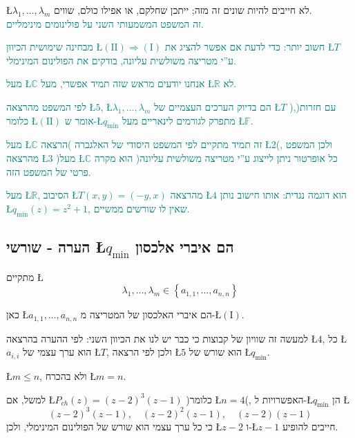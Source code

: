 \documentclass[english,hebrew]{article}
\begin{document}
\L{$\lambda_{1},\dots,\lambda_{m}$} לא חייבים להיות שונים זה מזה;
ייתכן שחלקם, או אפילו כולם, שווים. \\

\textcolor{teal}{זה המשפט המשמעותי השני על פולינומים מינימליים.}

\textcolor{teal}{מבחינה שימושית הכיוון \L{$(\text{II})\Rightarrow(\text{I})$}
חשוב יותר: כדי לדעת אם אפשר להציג את \L{$T$} ע\textquotedblright י
מטריצה משולשית עליונה, בודקים את הפולינום המינימלי.}

\textcolor{teal}{מעל \L{$\mathbb{C}$} אנחנו יודעים מראש שזה תמיד
אפשרי, מעל \L{$\mathbb{R}$} לא.}

\textcolor{teal}{לפי המשפט מהרצאה \L{$5$}, \L{$\lambda_{1},\dots,\lambda_{m}$}
הם בדיוק הערכים העצמיים של \L{$T$} )עם חזרות(, כלומר \L{$(\text{II})$}
אומר ש-\L{$q_{\min}$} מתפרק לגורמים לינאריים מעל \L{$\mathbb{F}$}.}

\textcolor{teal}{מעל \L{$\mathbb{C}$} זה תמיד מתקיים לפי המשפט היסודי
של האלגברה )הרצאה \L{$2$}(, ולכן המשפט מהרצאה \L{$3$} )מעל \L{$\mathbb{C}$}
כל אופרטור ניתן לייצוג ע\textquotedblright י מטריצה משולשית עליונה(
הוא מקרה פרטי של המשפט הזה. }

\textcolor{teal}{מעל \L{$\mathbb{R}$}, הסיבוב \L{$T(x,y)=(-y,x)$}
מהרצאה \L{$4$} הוא דוגמה נגדית: אותו חישוב נותן \L{$q_{\min}(z)=z^{2}+1$},
שאין לו שורשים ממשיים.}

\subsection{הערה - שורשי \L{$q_{\min}$} הם איברי אלכסון}

מתקיים \L{%
\[
\lambda_{1},\dots,\lambda_{m}\in\left\{ a_{1,1},\dots,a_{n,n}\right\} 
\]
}%

כאן \L{$a_{1,1},\dots,a_{n,n}$} הם איברי האלכסון של המטריצה מ-\L{$(\text{I})$}.

למעשה זה שוויון של קבוצות כי כבר יש לנו את הכיוון השני: לפי ההערה
בהרצאה \L{$4$}, כל \L{$a_{i,i}$} הוא ערך עצמי של \L{$T$}, ולכן
לפי הרצאה \L{$5$} הוא שורש של \L{$q_{\min}$}.

\L{$m\leq n$}, ולא בהכרח \L{$m=n$}.

למשל, אם \L{$P_{ch}(z)=(z-2)^{3}(z-1)$} )כלומר \L{$n=4$}(, האפשרויות
ל-\L{$q_{\min}$} הן \L{%
\[
(z-2)^{3}(z-1),\quad(z-2)^{2}(z-1),\quad(z-2)(z-1)
\]
}%
כי כל ערך עצמי הוא שורש של הפולינום המינימלי, ולכן \L{$z-2$} ו-\L{$z-1$}
חייבים להופיע.
\end{document}
